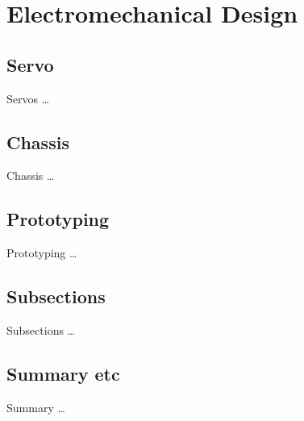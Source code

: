 \chapter{Electromechanical Design} \label{Chapter:ElectroMechDesign}

\section{Servo}
Servos \dots

\section{Chassis}
Chassis \dots

\section{Prototyping}
Prototyping \dots

\section{Subsections}
Subsections \dots

\section{Summary etc}
Summary \dots